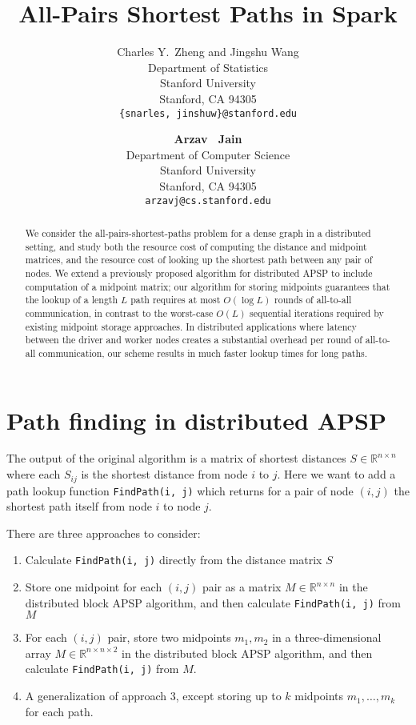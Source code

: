 \documentclass{article} %
\title{All-Pairs Shortest Paths in Spark}
\author{
Charles Y.~Zheng and Jingshu Wang\\
Department of Statistics\\
Stanford University\\
Stanford, CA 94305 \\
\texttt{\{snarles, jinshuw\}@stanford.edu} \\
\and
\textbf{Arzav ~Jain} \\
Department of Computer Science\\
Stanford University\\
Stanford, CA 94305 \\
\texttt{arzavj@cs.stanford.edu} \\
}
\newcommand{\real}{\mathbb{R}}
\begin{document}
\maketitle

\begin{abstract}
We consider the all-pairs-shortest-paths problem for a dense graph in
a distributed setting, and study both the resource cost of computing
the distance and midpoint matrices, and the resource cost of looking
up the shortest path between any pair of nodes.  We extend a
previously proposed algorithm for distributed APSP to include
computation of a midpoint matrix; our algorithm for storing midpoints
guarantees that the lookup of a length $L$ path requires at most
$O(\log L)$ rounds of all-to-all communication, in contrast to the
worst-case $O(L)$ sequential iterations required by existing midpoint
storage approaches.  In distributed applications where latency between
the driver and worker nodes creates a substantial overhead per round
of all-to-all communication, our scheme results in much faster lookup
times for long paths.
\end{abstract}

\section{Path finding in distributed APSP}

The output of the original algorithm is a matrix of shortest distances
$S \in \real^{n \times n}$ where each $S_{ij}$ is the shortest
distance from node $i$ to $j$. Here we want to add a path lookup
function {\tt FindPath(i, j)} which returns for a pair of node $(i,
j)$ the shortest path itself from node $i$ to node $j$.

There are three approaches to consider:
\begin{enumerate}
\item Calculate {\tt FindPath(i, j)} directly from the distance matrix $S$
\item Store one midpoint for each $(i, j)$ pair as a matrix $M \in \real^{n \times n}$ in the distributed block APSP algorithm, and then calculate {\tt FindPath(i, j)} from $M$
\item For each $(i, j)$ pair, store two midpoints $m_1, m_2$ in a three-dimensional array $M \in \real^{n \times n \times 2}$ in the distributed block APSP algorithm, and then calculate {\tt FindPath(i, j)} from $M$.
\item A generalization of approach 3, except storing up to $k$ midpoints $m_1,\hdots, m_k$ for each path.
\end{enumerate}
\end{document}
